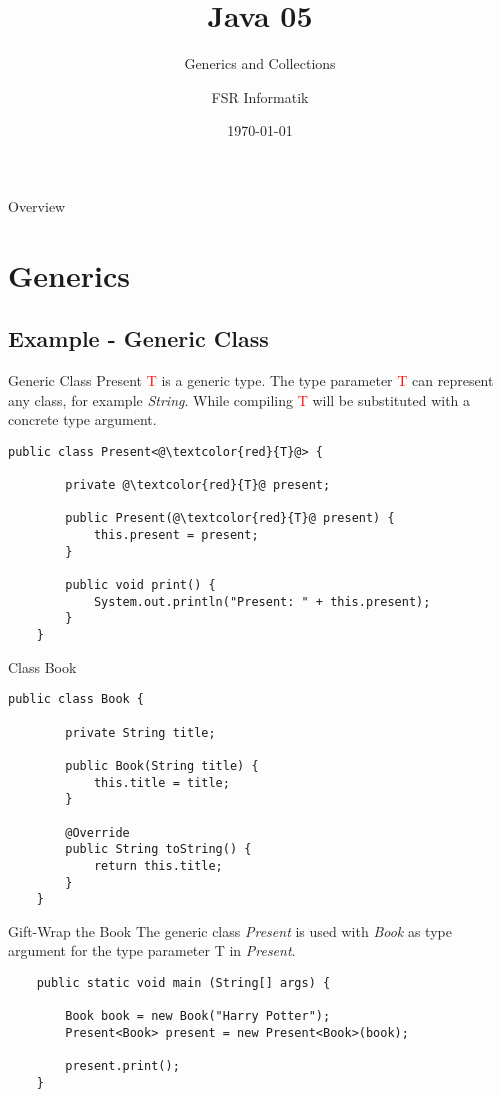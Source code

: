 

\title{Java 05}
\subtitle{Generics and Collections}
\author{FSR Informatik}
\date{\today}



\begin{frame}
\titlepage
\end{frame}
\begin{frame}{Overview}
\tableofcontents
\end{frame}

\section{Generics}
\subsection{Example - Generic Class}
\begin{frame}[fragile]{Generic Class Present}
	\textcolor{red}{T} is a generic type. 
	The type parameter \textcolor{red}{T} can represent any class, for example \emph{String}.
	While compiling \textcolor{red}{T} will be substituted with a concrete type argument.
	\begin{lstlisting}[basicstyle=\ttfamily\scriptsize]
	public class Present<@\textcolor{red}{T}@> {
	    
	    private @\textcolor{red}{T}@ present;
	    
	    public Present(@\textcolor{red}{T}@ present) {
	        this.present = present;
	    }
	    
	    public void print() {
	        System.out.println("Present: " + this.present);
	    }
	}
	\end{lstlisting}	
\end{frame}

\begin{frame}[fragile]{Class Book}
	\begin{lstlisting}[escapechar=!]
	public class Book {
	    
	    private String title;
	    
	    public Book(String title) {
	        this.title = title;
	    }
	    
	    @Override
	    public String toString() {
	        return this.title;
	    }
	}
	\end{lstlisting}	
\end{frame}

\begin{frame}[fragile]{Gift-Wrap the Book}
	The generic class \emph{Present} is used with \emph{Book} as type argument
	for the type parameter T in \emph{Present}.
	\vfill
	\begin{lstlisting}
	public static void main (String[] args) {
	    
	    Book book = new Book("Harry Potter");	    
	    Present<Book> present = new Present<Book>(book);
	    
	    present.print();
	}
	\end{lstlisting}
\end{frame}

